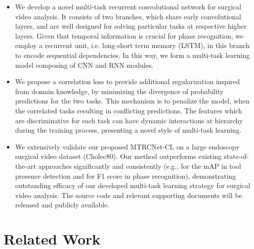 \documentclass{elsarticle}
\begin{document}
\begin{itemize}
	\item
	We develop a novel multi-task recurrent convolutional network for surgical video analysis. It consists of two branches, which share early convolutional layers, and are well designed for solving particular tasks at respective higher layers.
	Given that temporal information is crucial for phase recognition, we employ a recurrent unit, i.e. long-short term memory (LSTM), in this branch to encode sequential dependencies. In this way, we form a multi-task learning model composing of CNN and RNN modules.
	
	\item 
	We propose a correlation loss to provide additional regularization inspired from domain knowledge, by minimizing the divergence of probability predictions for the two tasks.
	This mechanism is to penalize the model, when the correlated tasks resulting in conflicting predictions.
	The features which are discriminative for each task can have dynamic interactions at hierarchy during the training process, presenting a novel style of multi-task learning.
	
	\item 
	We extensively validate our proposed MTRCNet-CL on a large endoscopy surgical video dataset (Cholec80). Our method outperforms existing state-of-the-art approaches significantly and consistently (e.g.,  for the mAP in tool presence detection and  for F1 score in phase recognition), demonstrating outstanding efficacy of our developed multi-task learning strategy for surgical video analysis. The source code and relevant supporting documents will be released and publicly available.
	
\end{itemize}





\section{Related Work}
\end{document}
